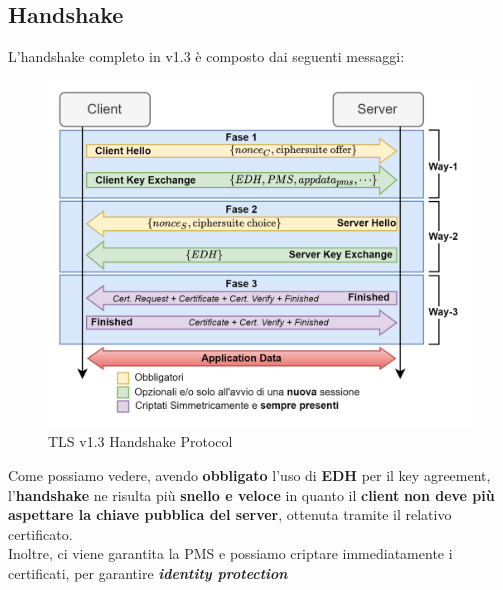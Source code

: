 \subsection{Handshake}
L'handshake completo in v1.3 è composto dai seguenti messaggi:
\begin{figure}[h]
    \centering
    \includegraphics[width=\linewidth]{image/handshakev13.png}
    \caption{TLS v1.3 Handshake Protocol}
    \label{fig:tlshand13}
\end{figure}
\begin{remark}
Come possiamo vedere, avendo \textbf{obbligato} l'uso di \textbf{EDH} per il key agreement, l'\textbf{handshake} ne risulta più \textbf{snello e veloce} in quanto il \textbf{client} \textbf{non deve più aspettare la chiave pubblica del server}, ottenuta tramite il relativo certificato.\\
Inoltre, ci viene garantita la PMS e possiamo criptare immediatamente i certificati, per garantire \textit{\textbf{identity protection}}
\end{remark}

